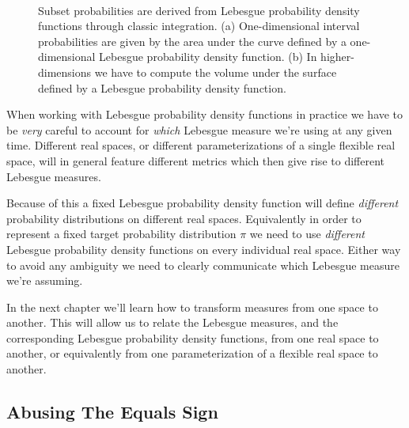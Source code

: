 \documentclass[
  letterpaper,
  DIV=11,
  numbers=noendperiod]{scrartcl}
\begin{document}
\begin{figure}
\begin{minipage}[t]{0.45\linewidth}
{{}

}

\subcaption{\label{fig-volume}}
\end{minipage}%
%
\begin{minipage}[t]{0.05\linewidth}

{\centering 

~

}

\end{minipage}%

\caption{\label{fig-interval-probs}Subset probabilities are derived from
Lebesgue probability density functions through classic integration. (a)
One-dimensional interval probabilities are given by the area under the
curve defined by a one-dimensional Lebesgue probability density
function. (b) In higher-dimensions we have to compute the volume under
the surface defined by a Lebesgue probability density function.}

\end{figure}

When working with Lebesgue probability density functions in practice we
have to be \emph{very} careful to account for \emph{which} Lebesgue
measure we're using at any given time. Different real spaces, or
different parameterizations of a single flexible real space, will in
general feature different metrics which then give rise to different
Lebesgue measures.

Because of this a fixed Lebesgue probability density function will
define \emph{different} probability distributions on different real
spaces. Equivalently in order to represent a fixed target probability
distribution \(\pi\) we need to use \emph{different} Lebesgue
probability density functions on every individual real space. Either way
to avoid any ambiguity we need to clearly communicate which Lebesgue
measure we're assuming.

In the next chapter we'll learn how to transform measures from one space
to another. This will allow us to relate the Lebesgue measures, and the
corresponding Lebesgue probability density functions, from one real
space to another, or equivalently from one parameterization of a
flexible real space to another.

\hypertarget{abusing-the-equals-sign}{%
\subsection{Abusing The Equals Sign}\label{abusing-the-equals-sign}}
\end{document}
